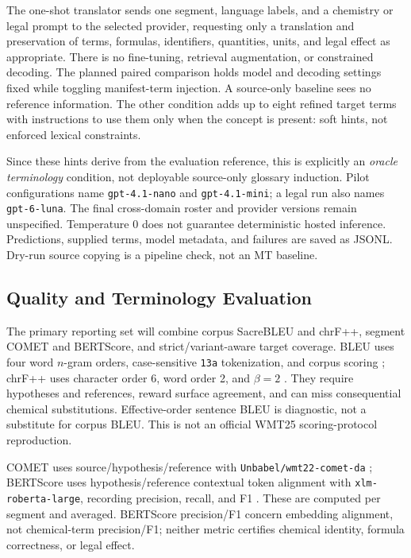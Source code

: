 \documentclass[11pt]{article}
\begin{document}
The one-shot translator sends one segment, language labels, and a chemistry or legal prompt to
the selected provider, requesting only a translation and preservation of terms, formulas,
identifiers, quantities, units, and legal effect as appropriate. There is no fine-tuning,
retrieval augmentation, or constrained decoding. The planned paired comparison holds model and
decoding settings fixed while toggling manifest-term injection. A source-only baseline sees no
reference information. The other condition adds up to eight refined target terms with instructions
to use them only when the concept is present: soft hints, not enforced lexical constraints.

Since these hints derive from the evaluation reference, this is explicitly an \emph{oracle
terminology} condition, not deployable source-only glossary induction. Pilot configurations name
\texttt{gpt-4.1-nano} and \texttt{gpt-4.1-mini}; a legal run also names \texttt{gpt-6-luna}.
The final cross-domain roster and provider versions remain unspecified. Temperature 0 does not
guarantee deterministic hosted inference. Predictions, supplied terms, model metadata, and failures
are saved as JSONL. Dry-run source copying is a pipeline check, not an MT baseline.

\subsection{Quality and Terminology Evaluation}
\label{sec:evaluation}

The primary reporting set will combine corpus SacreBLEU and chrF++, segment COMET and BERTScore,
and strict/variant-aware target coverage. BLEU uses four word $n$-gram orders, case-sensitive
\texttt{13a} tokenization, and corpus scoring \cite{papineni2002,post2018}; chrF++ uses character
order 6, word order 2, and $\beta=2$ \cite{popovic2017}. They require hypotheses and references,
reward surface agreement, and can miss consequential chemical substitutions. Effective-order
sentence BLEU is diagnostic, not a substitute for corpus BLEU. This is not an official WMT25
scoring-protocol reproduction.

COMET uses source/hypothesis/reference with \texttt{Unbabel/wmt22-comet-da} \cite{rei2020};
BERTScore uses hypothesis/reference contextual token alignment with \texttt{xlm-roberta-large},
recording precision, recall, and F1 \cite{zhang2020}. These are computed per segment and averaged.
BERTScore precision/F1 concern embedding alignment, not chemical-term precision/F1; neither
metric certifies chemical identity, formula correctness, or legal effect.
\end{document}
